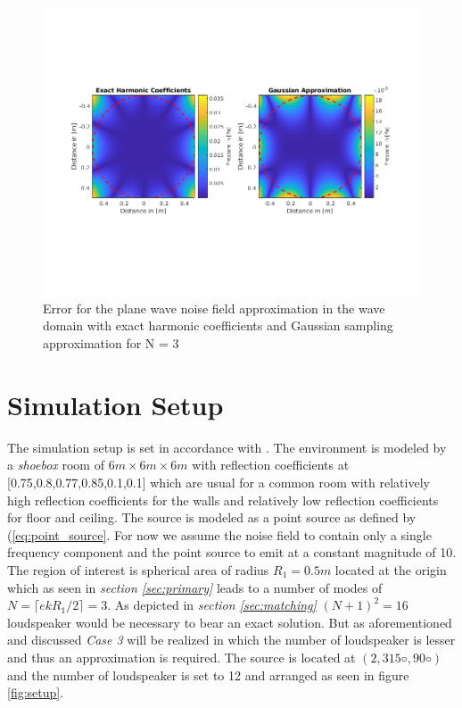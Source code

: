 \begin{figure}[H]
    \centerline{\includegraphics[width=180mm,keepaspectratio]{LaTeX/images/plots/Gauss_Approximation_Error.png}}
    \caption{Error for the plane wave noise field approximation in the wave domain with exact harmonic coefficients and Gaussian sampling approximation for N = 3}
    \label{fig:GaussianApproximationError}
\end{figure}

\section{Simulation Setup}
The simulation setup is set in accordance with \cite{Zhang2019}. The environment is modeled by a \textit{shoebox} room of $6m \times 6m \times 6m$ with reflection coefficients at [0.75,0.8,0.77,0.85,0.1,0.1] which are usual for a common room with relatively high reflection coefficients for the walls and relatively low reflection coefficients for floor and ceiling. The source is modeled as a point source as defined by (\ref{eq:point_source}. For now we assume the noise field to contain only a single frequency component and the point source to emit at a constant magnitude of 10.\\ The region of interest is spherical area of radius $R_1 = 0.5m$ located at the origin which as seen in \textit{section \ref{sec:primary}} leads to a number of modes of $N = \lceil ekR_1/2\rceil = 3$. As depicted in \textit{section \ref{sec:matching}} $(N+1)^2 = 16$ loudspeaker would be necessary to bear an exact solution. But as aforementioned and discussed \textit{Case 3} will be realized in which the number of loudspeaker is lesser and thus an approximation is required. The source is located at $(2, 315◦ , 90◦)$ and the number of loudspeaker is set to 12 and arranged as seen in figure \ref{fig:setup}.

